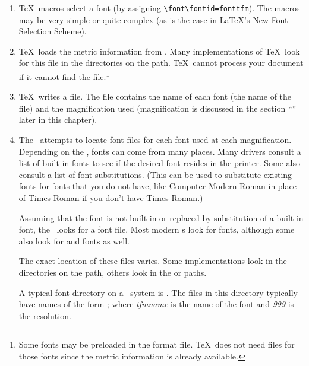 \begin{enumerate}
  \item \TeX\ macros 
        select a 
        font (by assigning \verb|\font\fontid=fonttfm|).  The macros
        may be very simple or quite complex (as is
        the case in \LaTeX's New Font Selection Scheme).
  \item \TeX\ loads the metric information from 
        .
        Many implementations of \TeX\ look for this file in the 
        directories on the  path.  \TeX\ cannot process
        your document if it cannot find 
        the  file.\footnote{Some
        fonts may be preloaded in the format file.  \TeX\ does not need
         files for those fonts since the metric information is
        already available.}
  \item \TeX\ writes a  file.  The  
        file contains the name
        of each font (the name of the  file) and the magnification
        used (magnification is discussed in the section 
        ``''
        later in this chapter).
  \item The \dvidriver\ attempts to locate font files for each font used
        at each magnification.  Depending on the \dvidriver, fonts can come
        from many places.  Many drivers consult a list of built-in fonts to
        see if the desired font resides in the printer.  Some also consult
        a list of font substitutions.  (This can be used to substitute existing
        fonts for fonts that you do not have, like Computer Modern Roman
        in place of Times Roman if you don't have Times Roman.)

        Assuming that the font is not 
        built-in or replaced by substitution
        of a built-in font, the \dvidriver\ looks for a font file.  Most
        modern \dvidriver{}s look for  fonts, although some also
        look for  
        and  fonts as well.

        The exact location of these files varies.  Some implementations look
        in the directories on the  path, others look in
        the  or  paths.

        A typical font directory on a \Unix\ system is 
        .
        The files in this directory typically have names of the form
        ; where \textit{tfmname} is
        the name of the font and \textit{999} is the resolution.


\end{enumerate}
